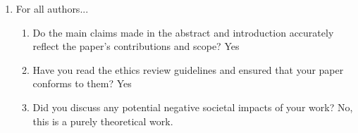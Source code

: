 \begin{enumerate}
\item For all authors...
\begin{enumerate}
\item  Do the main claims made in the abstract and introduction accurately reflect the paper's contributions and scope?
Yes


\item  Have you read the ethics review guidelines and ensured that your paper conforms to them?
Yes

\item  Did you discuss any potential negative societal impacts of your work?
No, this is a purely theoretical work.




\end{enumerate}
\end{enumerate}
